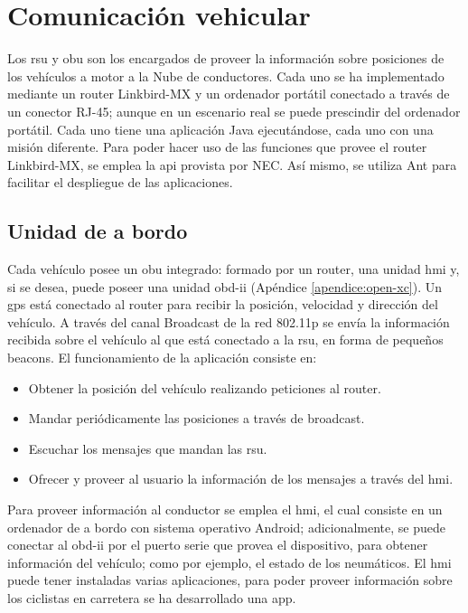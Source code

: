\section{Comunicación vehicular}\label{section:comunicacion_vehicular}
Los \gls{rsu} y \gls{obu} son los encargados de proveer la información sobre
posiciones de los vehículos a motor a la Nube de conductores. Cada uno se ha
implementado mediante un router Linkbird-MX y un ordenador portátil conectado
a través de un conector RJ-45; aunque en un escenario real se puede prescindir
del ordenador portátil. Cada uno tiene una aplicación Java ejecutándose, cada
uno con una misión diferente. Para poder hacer uso de las funciones que provee
el router Linkbird-MX, se emplea la \gls{api} provista por NEC. Así mismo, se
utiliza Ant para facilitar el despliegue de las aplicaciones.

\subsection{Unidad de a bordo}
Cada vehículo posee un \gls{obu} integrado: formado por un router, una unidad
\gls{hmi} y, si se desea, puede poseer una unidad \Gls{obd-ii} (Apéndice
\ref{apendice:open-xc}). Un \gls{gps} está conectado al router para recibir la
posición, velocidad y dirección del vehículo. A través del canal Broadcast de
la red \gls{802.11p} se envía la información recibida sobre el vehículo al que
está conectado a la \gls{rsu}, en forma de pequeños beacons. El funcionamiento
de la aplicación consiste en:
\begin{itemize}
	\item Obtener la posición del vehículo realizando peticiones al router.

	\item Mandar periódicamente las posiciones a través de broadcast.

	\item Escuchar los mensajes que mandan las \gls{rsu}.

	\item Ofrecer y proveer al usuario la información de los mensajes a través
	del \gls{hmi}.
\end{itemize}

Para proveer información al conductor se emplea el \gls{hmi}, el cual consiste
en un ordenador de a bordo con sistema operativo Android; adicionalmente, se
puede conectar al \Gls{obd-ii} por el puerto serie que provea el dispositivo,
para obtener información del vehículo; como por ejemplo, el estado de los
neumáticos. El \gls{hmi} puede tener instaladas varias aplicaciones, para poder
proveer información sobre los ciclistas en carretera se ha desarrollado una app.

